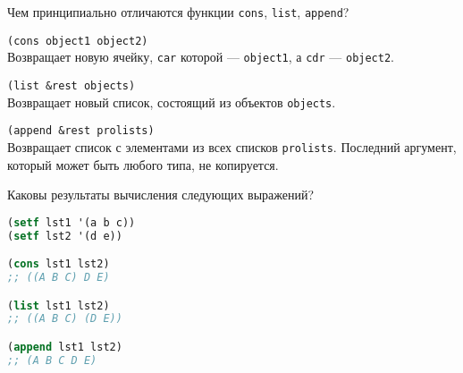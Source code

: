Чем принципиально отличаются функции \verb|cons|, \verb|list|, \verb|append|?

\verb|(cons object1 object2)| \\
Возвращает новую ячейку, \verb|car| которой --- \verb|object1|,
а \verb|cdr| --- \verb|object2|.

\verb|(list &rest objects)| \\
Возвращает новый список, состоящий из объектов \verb|objects|.

\verb|(append &rest prolists)| \\
Возвращает список с элементами из всех списков \verb|prolists|. Последний
аргумент, который может быть любого типа, не копируется.

Каковы результаты вычисления следующих выражений?

\begin{lstlisting}[language=Lisp]
(setf lst1 '(a b c))
(setf lst2 '(d e))

(cons lst1 lst2)
;; ((A B C) D E)

(list lst1 lst2)
;; ((A B C) (D E))

(append lst1 lst2)
;; (A B C D E)
\end{lstlisting}

